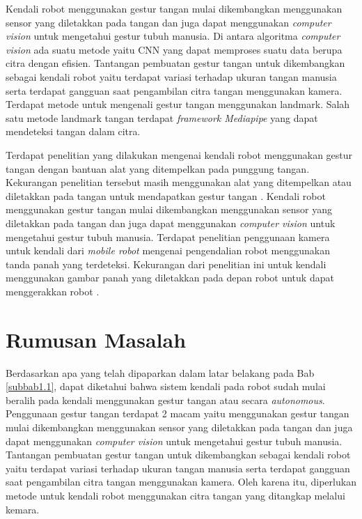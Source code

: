 Kendali robot menggunakan gestur tangan mulai dikembangkan menggunakan sensor yang diletakkan pada tangan dan juga dapat menggunakan \textit{computer vision} untuk mengetahui gestur tubuh manusia. Di antara algoritma \textit{computer vision} ada suatu metode yaitu CNN yang dapat memproses suatu data berupa citra dengan efisien. Tantangan pembuatan gestur tangan untuk dikembangkan sebagai kendali robot yaitu terdapat variasi terhadap ukuran tangan manusia serta terdapat gangguan saat pengambilan citra tangan menggunakan kamera. Terdapat metode untuk mengenali gestur tangan menggunakan landmark. Salah satu metode landmark tangan  terdapat \textit{framework Mediapipe} yang dapat mendeteksi tangan dalam citra. 

Terdapat penelitian yang dilakukan mengenai kendali robot menggunakan gestur tangan dengan bantuan alat yang ditempelkan pada punggung tangan. Kekurangan penelitian tersebut masih menggunakan alat yang ditempelkan atau diletakkan pada tangan untuk mendapatkan gestur tangan \parencite{ProsidingSeminarNasionalFisika}. Kendali robot menggunakan gestur tangan mulai dikembangkan menggunakan sensor yang diletakkan pada tangan dan juga dapat menggunakan \textit{computer vision} untuk mengetahui gestur tubuh manusia. Terdapat penelitian penggunaan kamera untuk kendali dari \textit{mobile robot} mengenai pengendalian robot menggunakan tanda panah yang terdeteksi. Kekurangan dari penelitian ini untuk kendali menggunakan gambar panah yang diletakkan pada depan robot untuk dapat menggerakkan robot \parencite{kukuh}. 


 


\section{Rumusan Masalah}
\label{subbab1.2}
Berdasarkan apa yang telah dipaparkan dalam latar belakang pada Bab \ref{subbab1.1}, dapat diketahui bahwa sistem kendali pada robot sudah mulai beralih pada kendali menggunakan gestur tangan atau secara \textit{autonomous}. Penggunaan gestur tangan terdapat 2 macam yaitu menggunakan gestur tangan mulai dikembangkan menggunakan sensor yang diletakkan pada tangan dan juga dapat menggunakan \textit{computer vision} untuk mengetahui gestur tubuh manusia. Tantangan pembuatan gestur tangan untuk dikembangkan sebagai kendali robot yaitu terdapat variasi terhadap ukuran tangan manusia serta terdapat gangguan saat pengambilan citra tangan menggunakan kamera. Oleh karena itu, diperlukan metode untuk kendali robot menggunakan citra tangan yang ditangkap melalui kemara.

